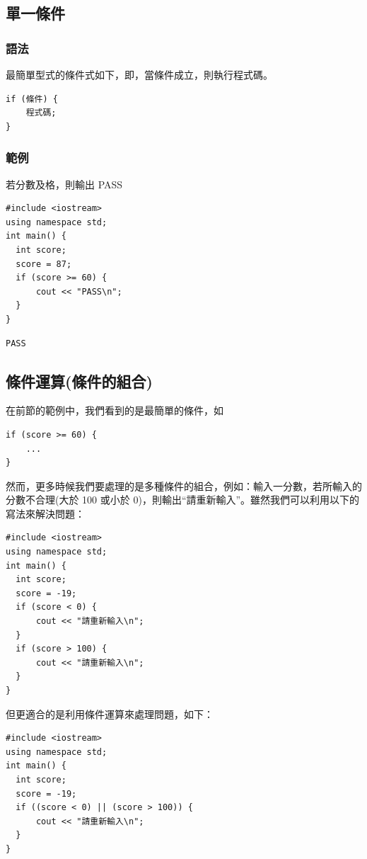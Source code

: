 \documentclass[12pt,a4paper]{article}
\begin{document}
\subsection{單一條件}
\label{sec:orgf738252}
\subsubsection{語法}
\label{sec:org4909736}
最簡單型式的條件式如下，即，當條件成立，則執行程式碼。
\lstset{breaklines=true,language=cpp,label= ,caption= ,captionpos=b,numbers=none}
\begin{lstlisting}
if (條件) {
    程式碼;
}
\end{lstlisting}

\subsubsection{範例}
\label{sec:orgfca760c}
若分數及格，則輸出 PASS
\lstset{breaklines=true,language=cpp,label= ,caption= ,captionpos=b,firstnumber=1,numbers=left}
\begin{lstlisting}
#include <iostream>
using namespace std;
int main() {
  int score;
  score = 87;
  if (score >= 60) {
      cout << "PASS\n";
  }
}
\end{lstlisting}

\begin{verbatim}
PASS
\end{verbatim}

\subsection{條件運算(條件的組合)}
\label{sec:org8963049}
在前節的範例中，我們看到的是最簡單的條件，如
\lstset{breaklines=true,language=cpp,label= ,caption= ,captionpos=b,firstnumber=1,numbers=left}
\begin{lstlisting}
if (score >= 60) {
    ...
}
\end{lstlisting}
然而，更多時候我們要處理的是多種條件的組合，例如：輸入一分數，若所輸入的分數不合理(大於 100 或小於 0)，則輸出``請重新輸入''。雖然我們可以利用以下的寫法來解決問題：
\lstset{breaklines=true,language=cpp,label= ,caption= ,captionpos=b,firstnumber=1,numbers=left}
\begin{lstlisting}
#include <iostream>
using namespace std;
int main() {
  int score;
  score = -19;
  if (score < 0) {
      cout << "請重新輸入\n";
  }
  if (score > 100) {
      cout << "請重新輸入\n";
  }
}
\end{lstlisting}
但更適合的是利用條件運算來處理問題，如下：
\lstset{breaklines=true,language=cpp,label= ,caption= ,captionpos=b,firstnumber=1,numbers=left}
\begin{lstlisting}
#include <iostream>
using namespace std;
int main() {
  int score;
  score = -19;
  if ((score < 0) || (score > 100)) {
      cout << "請重新輸入\n";
  }
}
\end{lstlisting}
\end{document}

